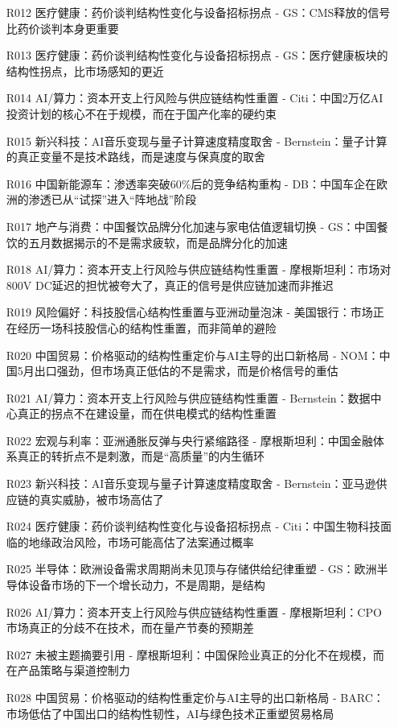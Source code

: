 \documentclass[11pt]{ctexart}
\begin{document}
\begin{itemize}
  \item [R012] 医疗健康：药价谈判结构性变化与设备招标拐点 - GS：CMS释放的信号比药价谈判本身更重要
  \item [R013] 医疗健康：药价谈判结构性变化与设备招标拐点 - GS：医疗健康板块的结构性拐点，比市场感知的更近
  \item [R014] AI/算力：资本开支上行风险与供应链结构性重置 - Citi：中国2万亿AI投资计划的核心不在于规模，而在于国产化率的硬约束
  \item [R015] 新兴科技：AI音乐变现与量子计算速度精度取舍 - Bernstein：量子计算的真正变量不是技术路线，而是速度与保真度的取舍
  \item [R016] 中国新能源车：渗透率突破60\%后的竞争结构重构 - DB：中国车企在欧洲的渗透已从“试探”进入“阵地战”阶段
  \item [R017] 地产与消费：中国餐饮品牌分化加速与家电估值逻辑切换 - GS：中国餐饮的五月数据揭示的不是需求疲软，而是品牌分化的加速
  \item [R018] AI/算力：资本开支上行风险与供应链结构性重置 - 摩根斯坦利：市场对800V DC延迟的担忧被夸大了，真正的信号是供应链加速而非推迟
  \item [R019] 风险偏好：科技股信心结构性重置与亚洲动量泡沫 - 美国银行：市场正在经历一场科技股信心的结构性重置，而非简单的避险
  \item [R020] 中国贸易：价格驱动的结构性重定价与AI主导的出口新格局 - NOM：中国5月出口强劲，但市场真正低估的不是需求，而是价格信号的重估
  \item [R021] AI/算力：资本开支上行风险与供应链结构性重置 - Bernstein：数据中心真正的拐点不在建设量，而在供电模式的结构性重置
  \item [R022] 宏观与利率：亚洲通胀反弹与央行紧缩路径 - 摩根斯坦利：中国金融体系真正的转折点不是刺激，而是“高质量”的内生循环
  \item [R023] 新兴科技：AI音乐变现与量子计算速度精度取舍 - Bernstein：亚马逊供应链的真实威胁，被市场高估了
  \item [R024] 医疗健康：药价谈判结构性变化与设备招标拐点 - Citi：中国生物科技面临的地缘政治风险，市场可能高估了法案通过概率
  \item [R025] 半导体：欧洲设备需求周期尚未见顶与存储供给纪律重塑 - GS：欧洲半导体设备市场的下一个增长动力，不是周期，是结构
  \item [R026] AI/算力：资本开支上行风险与供应链结构性重置 - 摩根斯坦利：CPO市场真正的分歧不在技术，而在量产节奏的预期差
  \item [R027] 未被主题摘要引用 - 摩根斯坦利：中国保险业真正的分化不在规模，而在产品策略与渠道控制力
  \item [R028] 中国贸易：价格驱动的结构性重定价与AI主导的出口新格局 - BARC：市场低估了中国出口的结构性韧性，AI与绿色技术正重塑贸易格局

\end{itemize}
\end{document}

